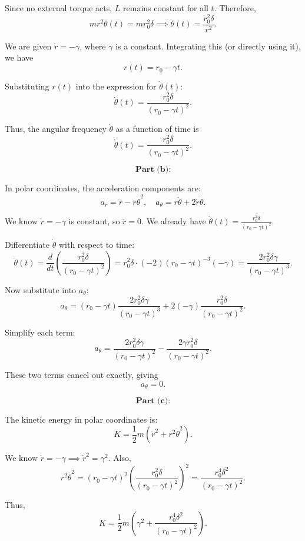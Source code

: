 \documentclass{article}
\begin{document}
Since no external torque acts, \(L\) remains constant for all \(t\). Therefore,
\[
m r^2 \dot{\theta}(t) = m r_0^2 \delta \implies \dot{\theta}(t) = \frac{r_0^2 \delta}{r^2}.
\]

We are given \(\dot{r} = -\gamma\), where \(\gamma\) is a constant. Integrating this (or directly using it), we have
\[
r(t) = r_0 - \gamma t.
\]

Substituting \(r(t)\) into the expression for \(\dot{\theta}(t)\):
\[
\dot{\theta}(t) = \frac{r_0^2 \delta}{(r_0 - \gamma t)^2}.
\]

Thus, the angular frequency \(\dot{\theta}\) as a function of time is
\[
\boxed{\dot{\theta}(t) = \frac{r_0^2 \delta}{(r_0 - \gamma t)^2}.}
\]

\[
\textbf{Part (b):}
\]

In polar coordinates, the acceleration components are:
\[
a_r = \ddot{r} - r \dot{\theta}^2, \quad a_\theta = r \ddot{\theta} + 2 \dot{r} \dot{\theta}.
\]

We know \(\dot{r} = -\gamma\) is constant, so \(\ddot{r} = 0\). We already have \(\dot{\theta}(t) = \frac{r_0^2 \delta}{(r_0 - \gamma t)^2}\).

Differentiate \(\dot{\theta}\) with respect to time:
\[
\ddot{\theta}(t) = \frac{d}{dt}\left(\frac{r_0^2 \delta}{(r_0 - \gamma t)^2}\right) 
= r_0^2 \delta \cdot (-2) (r_0 - \gamma t)^{-3}(-\gamma) 
= \frac{2 r_0^2 \delta \gamma}{(r_0 - \gamma t)^3}.
\]

Now substitute into \(a_\theta\):
\[
a_\theta = (r_0 - \gamma t) \frac{2 r_0^2 \delta \gamma}{(r_0 - \gamma t)^3} + 2(-\gamma)\frac{r_0^2 \delta}{(r_0 - \gamma t)^2}.
\]

Simplify each term:
\[
a_\theta = \frac{2 r_0^2 \delta \gamma}{(r_0 - \gamma t)^2} - \frac{2 \gamma r_0^2 \delta}{(r_0 - \gamma t)^2}.
\]

These two terms cancel out exactly, giving
\[
\boxed{a_\theta = 0.}
\]

\[
\textbf{Part (c):}
\]

The kinetic energy in polar coordinates is:
\[
K = \frac{1}{2}m(\dot{r}^2 + r^2 \dot{\theta}^2).
\]

We know \(\dot{r} = -\gamma \implies \dot{r}^2 = \gamma^2\). Also,
\[
r^2 \dot{\theta}^2 = (r_0 - \gamma t)^2 \left(\frac{r_0^2 \delta}{(r_0 - \gamma t)^2}\right)^2 
= \frac{r_0^4 \delta^2}{(r_0 - \gamma t)^2}.
\]

Thus,
\[
K = \frac{1}{2}m \left(\gamma^2 + \frac{r_0^4 \delta^2}{(r_0 - \gamma t)^2}\right).
\]
\end{document}
